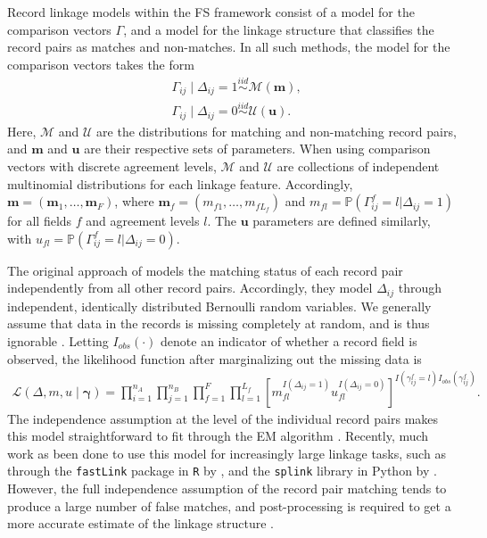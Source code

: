 \documentclass[12pt,letterpaper]{article}
\newcommand{\1}[1]{\mathbb{I}\!\left[#1\right]} %
\begin{document}
Record linkage models within the FS framework consist of a model for the comparison vectors $\Gamma$, and a model for the linkage structure that classifies the record pairs as matches and non-matches. In all such methods, the model for the comparison vectors takes the form
	\begin{align}
		&\Gamma_{ij} \mid \Delta_{ij} = 1 \stackrel{iid}{\sim} \mathcal{M}(\bm{m}), \label{eqn:fs_model} \\
		&\Gamma_{ij} \mid \Delta_{ij} = 0  \stackrel{iid}{\sim} \mathcal{U}(\bm{u}). \label{eqn:m_dist}
	\end{align}
Here, $\mathcal{M}$ and $\mathcal{U}$ are the distributions for matching and non-matching record pairs, and $\bm{m}$ and $\bm{u}$ are their respective sets of parameters. When using comparison vectors with discrete agreement levels, $\mathcal{M}$ and $\mathcal{U}$ are collections of independent multinomial distributions for each linkage feature. Accordingly, $\bm{m} = (\bm{m}_1, \ldots, \bm{m}_F)$, where $\bm{m}_f = (m_{f1}, \ldots, m_{fL_f})$ and $m_{fl} = \mathbb{P}(\Gamma_{ij}^f = l|\Delta_{ij} = 1)$ for all fields $f$ and agreement levels $l$. The $\bm{u}$ parameters are defined similarly, with $u_{fl} = \mathbb{P}(\Gamma_{ij}^f = l|\Delta_{ij} = 0)$. 

The original approach of \cite{fellegi_theory_1969} models the matching status of each record pair independently from all other record pairs. Accordingly, they model $\Delta_{ij}$ through independent, identically distributed Bernoulli random variables. We generally assume that data in the records is missing completely at random, and is thus ignorable \citep{little_statistical_2002}. Letting $I_{obs}(\cdot)$ denote an indicator of whether a record field is observed, the likelihood function after marginalizing out the missing data is
\begin{align}
	\label{eqn:likelihood}
	\mathcal{L}(\Delta, m,u\mid\bm{\gamma})=\prod_{i=1}^{n_A}\prod_{j=1}^{n_B}\prod_{f=1}^F\prod_{l=1}^{L_f}\left[m_{fl}^{I(\Delta_{ij} = 1)}u_{fl}^{I(\Delta_{ij} =0)}\right] ^{I(\gamma_{ij}^{f} = l) I_{obs}(\gamma_{ij}^f)}.
\end{align}
The independence assumption at the level of the individual record pairs makes this model straightforward to fit through the EM algorithm \citep{sariyar_2010}. Recently, much work as been done to use this model for increasingly large linkage tasks, such as through the
\texttt{fastLink} package in \texttt{R} by \cite{enamorado_using_2019}, and the \texttt{splink} library in Python by \cite{Linacre_Lindsay_Manassis_Slade_Hepworth_2022}. However, the full independence assumption of the record pair matching tends to produce a large number of false matches, and post-processing is required to get a more accurate estimate of the linkage structure \cite{jaro_1989}.
 
\end{document}
